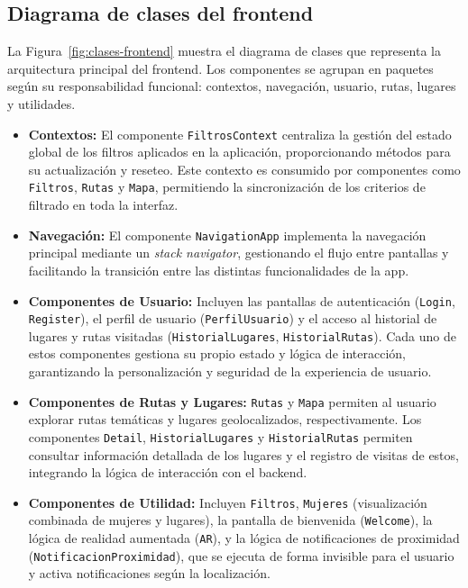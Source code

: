 \subsection{Diagrama de clases del frontend}

La Figura~\ref{fig:clases-frontend} muestra el diagrama de clases que representa la arquitectura principal del frontend. Los componentes se agrupan en paquetes según su responsabilidad funcional: contextos, navegación, usuario, rutas, lugares y utilidades.

\begin{itemize} \item \textbf{Contextos:} El componente \texttt{FiltrosContext} centraliza la gestión del estado global de los filtros aplicados en la aplicación, proporcionando métodos para su actualización y reseteo. Este contexto es consumido por componentes como \texttt{Filtros}, \texttt{Rutas} y \texttt{Mapa}, permitiendo la sincronización de los criterios de filtrado en toda la interfaz. \item \textbf{Navegación:} El componente \texttt{NavigationApp} implementa la navegación principal mediante un \textit{stack navigator}, gestionando el flujo entre pantallas y facilitando la transición entre las distintas funcionalidades de la app. \item \textbf{Componentes de Usuario:} Incluyen las pantallas de autenticación (\texttt{Login}, \texttt{Register}), el perfil de usuario (\texttt{PerfilUsuario}) y el acceso al historial de lugares y rutas visitadas (\texttt{HistorialLugares}, \texttt{HistorialRutas}). Cada uno de estos componentes gestiona su propio estado y lógica de interacción, garantizando la personalización y seguridad de la experiencia de usuario. \item \textbf{Componentes de Rutas y Lugares:} \texttt{Rutas} y \texttt{Mapa} permiten al usuario explorar rutas temáticas y lugares geolocalizados, respectivamente. Los componentes \texttt{Detail}, \texttt{HistorialLugares} y \texttt{HistorialRutas} permiten consultar información detallada de los lugares y el registro de visitas de estos, integrando la lógica de interacción con el backend. \item \textbf{Componentes de Utilidad:} Incluyen \texttt{Filtros}, \texttt{Mujeres} (visualización combinada de mujeres y lugares), la pantalla de bienvenida (\texttt{Welcome}), la lógica de realidad aumentada (\texttt{AR}), y la lógica de notificaciones de proximidad (\texttt{NotificacionProximidad}), que se ejecuta de forma invisible para el usuario y activa notificaciones según la localización. \end{itemize}

